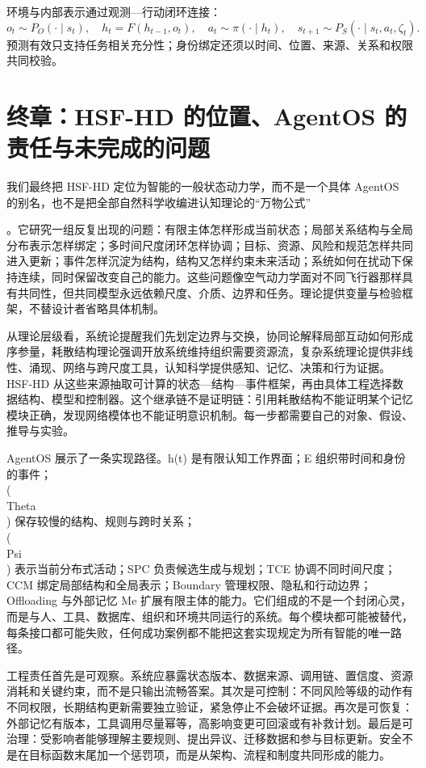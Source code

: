 环境与内部表示通过观测—行动闭环连接：
\begin{equation}
o_t\sim P_O(\cdot\mid s_t),\quad h_t=F(h_{t-1},o_t),\quad a_t\sim\pi(\cdot\mid h_t),\quad s_{t+1}\sim P_S(\cdot\mid s_t,a_t,\zeta_t).
\end{equation}
预测有效只支持任务相关充分性；身份绑定还须以时间、位置、来源、关系和权限共同校验。

\section{终章：HSF-HD 的位置、AgentOS 的责任与未完成的问题}

我们最终把 HSF-HD 定位为智能的一般状态动力学，而不是一个具体 AgentOS 的别名，也不是把全部自然科学收编进认知理论的“万物公式”

。它研究一组反复出现的问题：有限主体怎样形成当前状态；局部关系结构与全局分布表示怎样绑定；多时间尺度闭环怎样协调；目标、资源、风险和规范怎样共同进入更新；事件怎样沉淀为结构，结构又怎样约束未来活动；系统如何在扰动下保持连续，同时保留改变自己的能力。这些问题像空气动力学面对不同飞行器那样具有共同性，但共同模型永远依赖尺度、介质、边界和任务。理论提供变量与检验框架，不替设计者省略具体机制。

从理论层级看，系统论提醒我们先划定边界与交换，协同论解释局部互动如何形成序参量，耗散结构理论强调开放系统维持组织需要资源流，复杂系统理论提供非线性、涌现、网络与跨尺度工具，认知科学提供感知、记忆、决策和行为证据。HSF-HD 从这些来源抽取可计算的状态—结构—事件框架，再由具体工程选择数据结构、模型和控制器。这个继承链不是证明链：引用耗散结构不能证明某个记忆模块正确，发现网络模体也不能证明意识机制。每一步都需要自己的对象、假设、推导与实验。

AgentOS 展示了一条实现路径。h(t) 是有限认知工作界面；E 组织带时间和身份的事件；\\(\\Theta\\) 保存较慢的结构、规则与跨时关系；\\(\\Psi\\) 表示当前分布式活动；SPC 负责候选生成与规划；TCE 协调不同时间尺度；CCM 绑定局部结构和全局表示；Boundary 管理权限、隐私和行动边界；Offloading 与外部记忆 Me 扩展有限主体的能力。它们组成的不是一个封闭心灵，而是与人、工具、数据库、组织和环境共同运行的系统。每个模块都可能被替代，每条接口都可能失败，任何成功案例都不能把这套实现规定为所有智能的唯一路径。

工程责任首先是可观察。系统应暴露状态版本、数据来源、调用链、置信度、资源消耗和关键约束，而不是只输出流畅答案。其次是可控制：不同风险等级的动作有不同权限，长期结构更新需要独立验证，紧急停止不会破坏证据。再次是可恢复：外部记忆有版本，工具调用尽量幂等，高影响变更可回滚或有补救计划。最后是可治理：受影响者能够理解主要规则、提出异议、迁移数据和参与目标更新。安全不是在目标函数末尾加一个惩罚项，而是从架构、流程和制度共同形成的能力。

